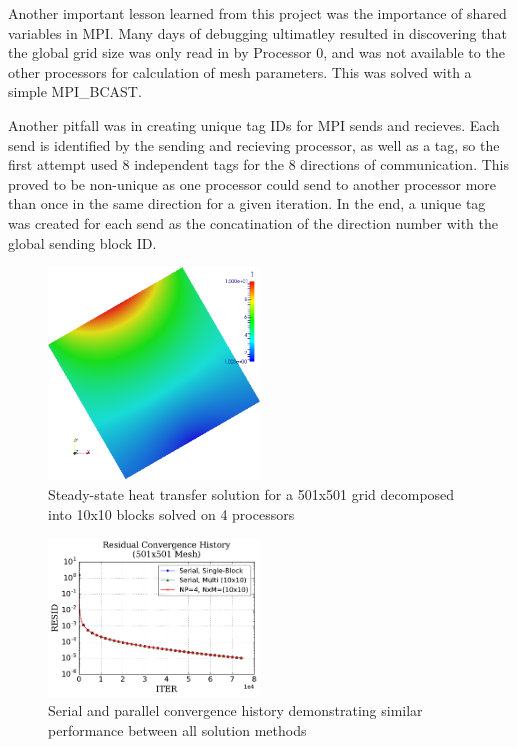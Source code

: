 \documentclass[twocolumn,10pt]{asme2ej}
\begin{document}
Another important lesson learned from this project was the importance of shared variables in MPI.  Many days of debugging ultimatley resulted in discovering that the global grid size was only read in by Processor 0, and was not available to the other processors for calculation of mesh parameters.  This was solved with a simple MPI\_BCAST.

Another pitfall was in creating unique tag IDs for MPI sends and recieves.  Each send is identified by the sending and recieving processor, as well as a tag, so the first attempt used 8 independent tags for the 8 directions of communication.  This proved to be non-unique as one processor could send to another processor more than once in the same direction for a given iteration.  In the end, a unique tag was created for each send as the concatination of the direction number with the global sending block ID.

\begin{figure}[htb]
\begin{center}
\includegraphics[width=0.5\textwidth]{../Results/np4_nx501_n10_m10/Composite.png}
\caption{Steady-state heat transfer solution for a 501x501 grid decomposed into 10x10 blocks solved on 4 processors}
\label{Temp}
\end{center}
\end{figure}

\begin{figure}[htb]
\begin{center}
\includegraphics[width=0.5\textwidth]{../Results/ResHist.pdf}
\caption{Serial and parallel convergence history demonstrating similar performance between all solution methods}
\label{ResHist}
\end{center}
\end{figure}
\end{document}
